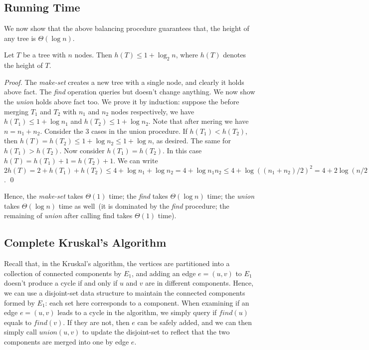 \subsection*{Running Time}

We now show that the above balancing procedure guarantees
that, the height of any tree is $\Theta(\log n)$. 
\begin{fact}
Let $T$ be a tree with $n$ nodes. Then $h(T) \le 1 + \log_2 n$, where $h(T)$ denotes the height of $T$.
\end{fact}
\emph{Proof.} The \emph{make-set} creates a new tree with a single node, and clearly it holds above fact.
The \emph{find} operation queries but doesn't change anything. We now show the \emph{union}
holds above fact too. We prove it by induction: suppose the before merging $T_1$ and $T_2$
with $n_1$ and $n_2$ nodes respectively, we have $h(T_1) \le 1 + \log n_1$ and $h(T_2) \le 1 + \log n_2$.
Note that after mering we have $n = n_1 + n_2$.
Consider the 3 cases in the union procedure. 
If $h(T_1) < h(T_2)$, then $h(T) = h(T_2) \le 1 + \log n_2 \le 1 + \log n$, as desired.
The same for $h(T_1) > h(T_2)$. Now consider $h(T_1) = h(T_2)$.
In this case $h(T) = h(T_1) + 1 = h(T_2) + 1$.
We can write $2h(T) = 2 + h(T_1) + h(T_2) \le 4 + \log n_1 + \log n_2 = 4 + \log n_1n_2 \le 4 + \log((n_1+n_2)/2)^2 = 4 + 2\log (n/2) = 2(1+\log n)$.  \qed

Hence, the \emph{make-set} takes $\Theta(1)$ time;
the \emph{find} takes $\Theta(\log n)$ time;
the \emph{union} takes $\Theta(\log n)$ time as well~(it is dominated by the \emph{find} procedure; the remaining of \emph{union}
after calling find takes $\Theta(1)$ time).

\subsection*{Complete Kruskal's Algorithm}

Recall that, in the Kruskal's algorithm, the vertices are partitioned
into a collection of connected components by $E_1$,
and adding an edge $e = (u,v)$ to $E_1$ doesn't produce a cycle
if and only if $u$ and $v$ are in different components.
Hence, we can use a disjoint-set data structure
to maintain the connected components formed by $E_1$: 
each set here corresponds to a component.
When examining if an edge $e=(u,v)$ leads to a cycle in the algorithm,
we simply query if $find(u)$ equals to $find(v)$.
If they are not, then $e$ can be safely added,
and we can then simply call $union(u,v)$ to update the
disjoint-set to reflect that the two components are merged into one
by edge $e$.

